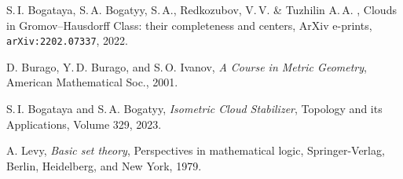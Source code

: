 \documentclass[leqno]{article}
\begin{document}
\begin{thebibliography}{99}
S.\,I. Bogataya, S.\,A. Bogatyy, S.\,A., Redkozubov, V.\,V. \& Tuzhilin A.\,A. , Clouds in Gromov--Hausdorff Class: their completeness and centers, ArXiv e-prints, \texttt{arXiv:2202.07337}, 2022.

D. Burago, Y.\,D. Burago, and S.\,O. Ivanov, \emph{A Course in Metric Geometry}, American Mathematical Soc., 2001.

S.\,I. Bogataya and S.\,A. Bogatyy, \emph{Isometric Cloud Stabilizer}, Topology and its Applications, Volume 329, 2023.

A. Levy, \emph{Basic set theory}, Perspectives in mathematical logic, Springer-Verlag, Berlin, Heidelberg, and New York, 1979.

\end{thebibliography}
\end{document}
